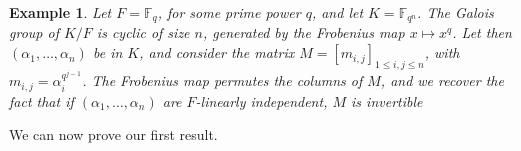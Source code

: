 \documentclass[12pt]{article}
\theoremstyle{plain}
\newtheorem{theorem}{Theorem}
\newtheorem{example}[theorem]{Example}
\newcommand{\F}{\ensuremath{\mathbb{F}}}
\begin{document}
\begin{example}\label{ex:Moore}
  Let $F=\F_q$, for some prime power $q$, and let $K=\F_{q^n}$.  The
  Galois group of $K/F$ is cyclic of size $n$, generated by the Frobenius
  map $x \mapsto x^q$. Let then $(\alpha_1,\dots,\alpha_n)$ be in $K$,
  and consider the matrix $M=[m_{i,j}]_{1 \le i,j \le n}$, with
  $m_{i,j} = \alpha_i^{q^{j-1}}$. The Frobenius map permutes the
  columns of $M$, and we recover the fact that if
  $(\alpha_1,\dots,\alpha_n)$ are $F$-linearly independent, $M$ is
  invertible~\cite[Corollary~1.3.4]{Goss}
\end{example}


We can now prove our first result.

\end{document}
